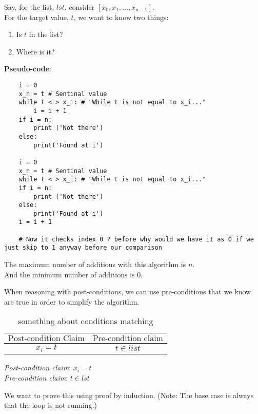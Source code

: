 \documentclass{article}
\begin{document}
    Say, for the list, $lst$, consider $[x_0,x_1,\dots,x_{n-1}]$. \\
    For the target value, $t$, we want to know two things: \begin{enumerate}
        \item Is $t$ in the list?
        \item Where is it?
    \end{enumerate}
    \textbf{Pseudo-code}:
    \begin{lstlisting}
    i = 0
    x_n = t # Sentinal value 
    while t < > x_i: # "While t is not equal to x_i..."
        i = i + 1
    if i = n:
        print ('Not there')
    else:
        print('Found at i')

    i = 0
    x_n = t # Sentinal value 
    while t < > x_i: # "While t is not equal to x_i..."
    if i = n:
        print ('Not there')
    else:
        print('Found at i')
    i = i + 1

    # Now it checks index 0 ? before why would we have it as 0 if we just skip to 1 anyway before our comparison
    \end{lstlisting}

    The maximum number of additions with this algorithm is $n$. \\
    \indent And the minimum number of additions is 0.
    
    \begin{yap}
        When reasoning with post-conditions, we can use pre-conditions that we know are true in order to simplify the algorithm.
    \end{yap}

    \begin{table}[ht]
            \centering
            \begin{tabular}{c|c}
                $\text{Post-condition Claim}$ & $\text{Pre-condition claim}$ \\
                \hline
                $x_i = t$ & $t \in list$ \\
            \end{tabular}
            \caption{something about conditions matching}
            \label{Bottom Up A(n)}
    \end{table}
    \textit{Post-condition claim}: $x_i = t$ \\
    \textit{Pre-condition claim}: $t \in lst$

    We want to prove this using proof by induction. (Note: The base case is always that the loop is not running.) \\
\end{document}
